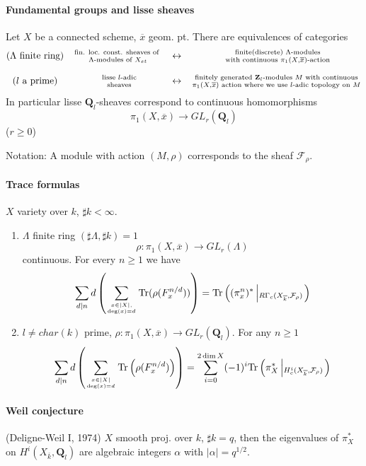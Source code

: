 \paragraph{Fundamental groups and lisse sheaves}
Let $X$ be a connected scheme, $\overline x$ geom. pt. There are
equivalences of categories
$$
\begin{matrix}
\text{($\Lambda$ finite ring)}& \text{fin. loc. const. sheaves
of }
\atop \Lambda\text{-modules of }X_{et} & \leftrightarrow &
\text{ finite(discrete) }\Lambda\text{-modules}\atop\text{ with continuous
}\pi_1(X, \overline x)\text{-action}\\
\\
(l\text{ a prime}) & \text{ lisse }l\text{-adic}\atop\text{
sheaves} & \leftrightarrow & \text{ finitely generated
}\mathbf{Z}_l\text{-modules } M \text{ with continuous }\atop \pi_1(X,
\overline x)\text{ action where we use $l$-adic topology on } M
\end{matrix}
$$
In particular lisse $\mathbf{Q}_l$-sheaves correspond to continuous
homomorphisms
$$\pi_1(X, \overline x) \to GL_r(\mathbf{Q}_l)$$
($r\geq 0$)

Notation: A module with action $(M, \rho)$ corresponds to the sheaf
$\mathcal{F}_\rho$.

\paragraph{Trace formulas} $X$ variety over $k$, $\sharp k<\infty$.
\begin{enumerate}
\item $\Lambda$ finite ring $(\sharp \Lambda, \sharp k)=1$
$$\rho: \pi_1(X, \overline x)\to GL_r(\Lambda)$$
continuous. For every $n\geq 1$ we have
$$\sum_{d|n}d\left(\sum_{x\in |X|,
\atop\deg(x)=d}\text{Tr}(\rho(F_x^{n/d}))\right) =
\text{Tr}\left((\pi_x^n)^*\left|_{R\Gamma_c(X_{\overline k},
\mathcal{F}_\rho)}\right.\right)$$

\item $l\neq char(k)$ prime, $\rho: \pi_1(X, \overline x)\to
GL_r(\mathbf{Q}_l)$. For any $n\geq 1$
$$\sum_{d|n}d\left(\sum_{x\in |X|\atop
\deg(x)=d}\text{Tr}\left(\rho(F_x^{n/d})\right)\right)=\sum_{i=0}^{2\dim
X}(-1)^i \text{Tr}\left(\pi_X^*\left|_{H_c^i(X_{\overline k},
\mathcal{F}_\rho)}\right.\right)$$
\end{enumerate}

\paragraph{Weil conjecture} (Deligne-Weil I, 1974) $X$ smooth proj. over $k$,
$\sharp k=q$, then the eigenvalues of $\pi_X^*$ on $H^i(X_{\overline k},
\mathbf{Q}_l)$ are algebraic integers $\alpha$ with $|\alpha|=q^{1/2}$.

